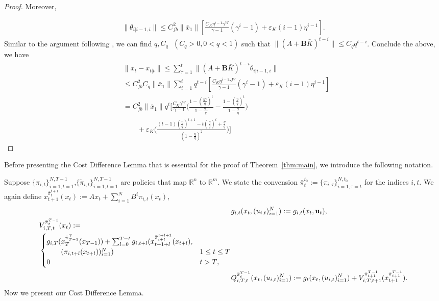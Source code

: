 \documentclass[letterpaper, 10 pt, conference]{ieeeconf}  %
\begin{document}
\begin{proof}
Moreover,

\begin{align*}
    \|\theta_{i|i-1,i}\| \leq C_{fb}^{2}\|\bar{x}_{1}\|[\frac{C_{K}\eta^{i-1}\gamma^{W}}{\gamma-1}(\gamma^{i}-1) + \varepsilon_{K}(i-1)\eta^{i-1}].
\end{align*}
Similar to the argument following \cite[Lemma 10, (25)]{chen_regret_2023}, we can find $q,C_{q}\text{ }(C_{q}>0,0<q<1)$ such that $\|(A+\mathbf{B}\bar{K})^{t-i}\| \leq C_{q}q^{t-i}$. Conclude the above, we have
\begin{align*}
    &\|x_{t}-x_{t|t}\| \leq \sum_{\tau=1}^{t}\|(A+\mathbf{B}\bar{K})^{t-i}\theta_{i|i-1,i}\|\\
    &\leq C_{fb}^{2}C_{q}\|\bar{x}_{1}\|\sum_{i=1}^{t}q^{t-i}[\frac{C_{K}\eta^{i-1}\gamma^{W}}{\gamma-1}(\gamma^{i}-1) + \varepsilon_{K}(i-1)\eta^{i-1}]\\
    &= C_{fb}^{2}\|\bar{x}_{1}\|q^{t}[\frac{C_{K}\gamma^{W}}{\gamma-1}\bigg(\frac{1-(\frac{\eta\gamma}{q})^{t}}{1-\frac{\eta\gamma}{q}} - \frac{1-(\frac{\eta}{q})^{t}}{1-\frac{\eta}{q}} \bigg)\\
    &\qquad+\varepsilon_{K}\bigg(\frac{(t-1)(\frac{\eta}{q})^{t+1}-t(\frac{\eta}{q})^{t}+\frac{\eta}{q}}{(1-\frac{\eta}{q})^{2}}\bigg)]
\end{align*}
\end{proof}

Before presenting the Cost Difference Lemma that is essential for the proof of Theorem~\ref{thm:main}, we introduce the following notation.

Suppose $\{\pi_{i,t}\}_{i=1,t=1}^{N,T-1}$,$\{\tilde{\pi}_{i,t}\}_{i=1,t=1}^{N,T-1}$ are policies that map $\mathbb{R}^{n}$ to $\mathbb{R}^{m}$. We state the convension $\bar{\pi}_{t}^{t_{0}} := \{\pi_{i,\tau}\}_{i=1,\tau=t}^{N,t_{0}}$ for the indices $i,t$.
We again define $x_{t+1}^{\bar{\pi}_{t}^{t+1}}(x_{t}):= Ax_{t} + \sum_{i=1}^{N} B^{i}\pi_{i,t}(x_{t})$,
\begin{align*}
&g_{i,t}(x_{t}, (u_{i,t})_{i=1}^{N}) := g_{i,t}(x_{t}, \mathbf{u}_{t}),\\
    \begin{split}
        &V_{i,T,t}^{\bar{\pi}_{t}^{T-1}}(x_{t}) := \\
        &\begin{cases}
            g_{i,T}(x_{T}^{\bar{\pi}_{T-1}^{T}}(x_{T-1}))+\sum_{l=0}^{T-t} g_{i,t+l}(x_{t+1+l}^{\bar{\pi}_{t+l}^{t+l+1}}(x_{t+l}),\\
            \qquad (\pi_{i,t+l}(x_{t+l}))_{i=1}^{N}) & \text{$1 \leq t \leq T$}\\
            $0$ & \text{$t > T$},
        \end{cases}
    \end{split}
    \\
    &Q_{i,T,t}^{\bar{\pi}_{t}^{T-1}}(x_{t},(u_{i,t})_{i=1}^{N}) := g_{t}(x_{t},(u_{i,t})_{i=1}^{N}) + V_{i,T,t+1}^{\bar{\pi}_{t+1}^{T-1}}(x_{t+1}^{\bar{\pi}_{t+1}^{T-1}}).
\end{align*}
Now we present our Cost Difference Lemma.
\end{document}
